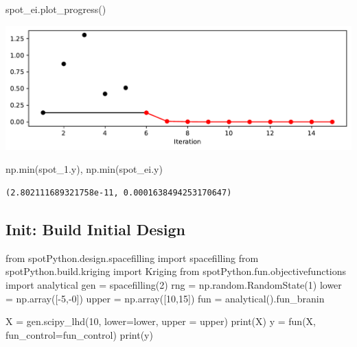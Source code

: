 \documentclass[
  letterpaper,
  DIV=11,
  numbers=noendperiod]{scrreprt}
\newenvironment{Shaded}{\begin{snugshade}}{\end{snugshade}}
\newcommand{\BuiltInTok}[1]{\textcolor[rgb]{0.00,0.23,0.31}{#1}}
\newcommand{\DecValTok}[1]{\textcolor[rgb]{0.68,0.00,0.00}{#1}}
\newcommand{\ImportTok}[1]{\textcolor[rgb]{0.00,0.46,0.62}{#1}}
\newcommand{\NormalTok}[1]{\textcolor[rgb]{0.00,0.23,0.31}{#1}}
\newcommand{\OperatorTok}[1]{\textcolor[rgb]{0.37,0.37,0.37}{#1}}
\begin{document}
\begin{Shaded}
\begin{Highlighting}[]
\NormalTok{spot\_ei.plot\_progress()}
\end{Highlighting}
\end{Shaded}

\includegraphics{012_num_spot_ei_files/figure-pdf/cell-18-output-1.pdf}

\begin{Shaded}
\begin{Highlighting}[]
\NormalTok{np.}\BuiltInTok{min}\NormalTok{(spot\_1.y), np.}\BuiltInTok{min}\NormalTok{(spot\_ei.y)}
\end{Highlighting}
\end{Shaded}

\begin{verbatim}
(2.802111689321758e-11, 0.0001638494253170647)
\end{verbatim}

\subsection{Init: Build Initial Design}\label{init-build-initial-design}

\begin{Shaded}
\begin{Highlighting}[]
\ImportTok{from}\NormalTok{ spotPython.design.spacefilling }\ImportTok{import}\NormalTok{ spacefilling}
\ImportTok{from}\NormalTok{ spotPython.build.kriging }\ImportTok{import}\NormalTok{ Kriging}
\ImportTok{from}\NormalTok{ spotPython.fun.objectivefunctions }\ImportTok{import}\NormalTok{ analytical}
\NormalTok{gen }\OperatorTok{=}\NormalTok{ spacefilling(}\DecValTok{2}\NormalTok{)}
\NormalTok{rng }\OperatorTok{=}\NormalTok{ np.random.RandomState(}\DecValTok{1}\NormalTok{)}
\NormalTok{lower }\OperatorTok{=}\NormalTok{ np.array([}\OperatorTok{{-}}\DecValTok{5}\NormalTok{,}\OperatorTok{{-}}\DecValTok{0}\NormalTok{])}
\NormalTok{upper }\OperatorTok{=}\NormalTok{ np.array([}\DecValTok{10}\NormalTok{,}\DecValTok{15}\NormalTok{])}
\NormalTok{fun }\OperatorTok{=}\NormalTok{ analytical().fun\_branin}

\NormalTok{X }\OperatorTok{=}\NormalTok{ gen.scipy\_lhd(}\DecValTok{10}\NormalTok{, lower}\OperatorTok{=}\NormalTok{lower, upper }\OperatorTok{=}\NormalTok{ upper)}
\BuiltInTok{print}\NormalTok{(X)}
\NormalTok{y }\OperatorTok{=}\NormalTok{ fun(X, fun\_control}\OperatorTok{=}\NormalTok{fun\_control)}
\BuiltInTok{print}\NormalTok{(y)}
\end{Highlighting}
\end{Shaded}
\end{document}
